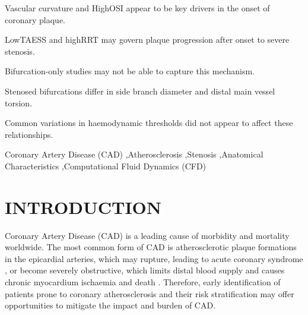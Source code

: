 \documentclass[preprint,11pt,review]{elsarticle}
\begin{document}
\begin{frontmatter}
\begin{graphicalabstract}
\end{graphicalabstract}

\begin{highlights}
\item Vascular curvature and HighOSI appear to be key drivers in the onset of coronary plaque.
\item LowTAESS and highRRT may govern plaque progression after onset to severe stenosis. 
\item Bifurcation-only studies may not be able to capture this mechanism. 
\item Stenosed bifurcations differ in side branch diameter and distal main vessel torsion.
\item Common variations in haemodynamic thresholds did not appear to affect these relationships. 
\end{highlights}


\begin{keyword}

Coronary Artery Disease (CAD) \sep Atherosclerosis \sep Stenosis \sep Anatomical Characteristics \sep Computational Fluid Dynamics (CFD)
\end{keyword}

\end{frontmatter}



\section{INTRODUCTION}

Coronary Artery Disease (CAD) is a leading cause of morbidity and mortality worldwide. The most common form of CAD is atherosclerotic plaque formations in the epicardial arteries, which may rupture, leading to acute coronary syndrome \cite{Bentzon2014Mechanisms}, or become severely obstructive, which limits distal blood supply and causes chronic myocardium ischaemia and death \cite{Xaplanteris2018Five-Year}. Therefore, early identification of patients prone to coronary atherosclerosis and their risk stratification may offer opportunities to mitigate the impact and burden of CAD.
\end{document}

